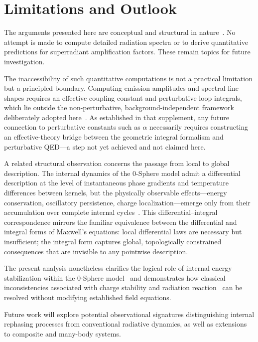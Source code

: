 \documentclass[12pt,a4paper]{article}
\begin{document}
\section{Limitations and Outlook}
\label{sec:limitations}

\justifying

The arguments presented here are conceptual and structural in nature~\cite{hanamura18603340}. No attempt is made to compute detailed radiation spectra or to derive quantitative predictions for superradiant amplification factors. These remain topics for future investigation.

The inaccessibility of such quantitative computations is not a practical limitation but a principled boundary. Computing emission amplitudes and spectral line shapes requires an effective coupling constant and perturbative loop integrals, which lie outside the non-perturbative, background-independent framework deliberately adopted here~\cite{hanamura18603340}. As established in that supplement, any future connection to perturbative constants such as $\alpha$ necessarily requires constructing an effective-theory bridge between the geometric integral formalism and perturbative QED---a step not yet achieved and not claimed here.

A related structural observation concerns the passage from local to global description. The internal dynamics of the 0-Sphere model admit a differential description at the level of instantaneous phase gradients and temperature differences between kernels, but the physically observable effects---energy conservation, oscillatory persistence, charge localization---emerge only from their accumulation over complete internal cycles~\cite{hanamura18356895}. This differential--integral correspondence mirrors the familiar equivalence between the differential and integral forms of Maxwell's equations: local differential laws are necessary but insufficient; the integral form captures global, topologically constrained consequences that are invisible to any pointwise description.

The present analysis nonetheless clarifies the logical role of internal energy stabilization within the 0-Sphere model~\cite{hanamura16759284} and demonstrates how classical inconsistencies associated with charge stability and radiation reaction~\cite{dirac1938,jackson1999} can be resolved without modifying established field equations.

Future work will explore potential observational signatures distinguishing internal rephasing processes from conventional radiative dynamics, as well as extensions to composite and many-body systems.
\end{document}
